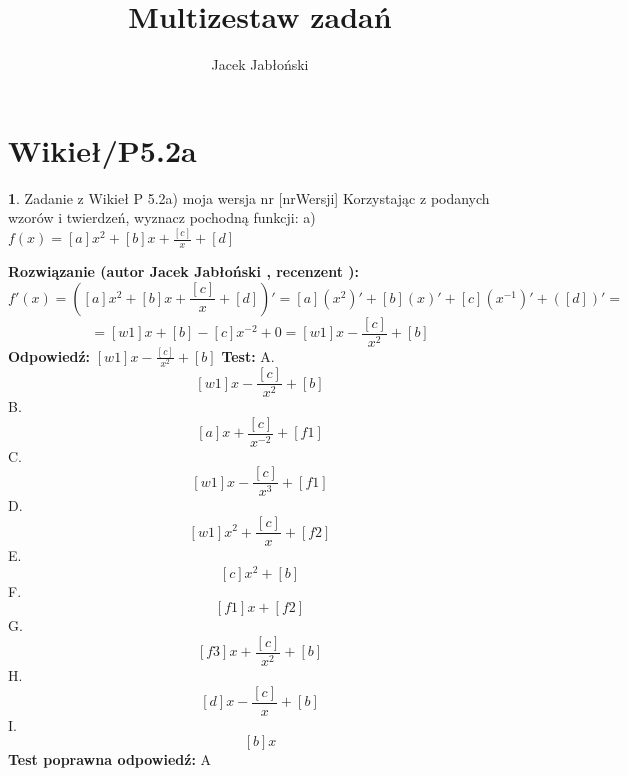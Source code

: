 \documentclass[12pt, a4paper]{article}
\title{Multizestaw zadań}
\author{Jacek Jabłoński}
\date{}
\theoremstyle{definition} %
\newtheorem{zad}{}
\newcommand{\kategoria}[1]{\section{#1}} %
\newcommand{\zadStart}[1]{\begin{zad}#1\newline} %
\newcommand{\zadStop}{\end{zad}}   %
\newcommand{\rozwStart}[2]{\noindent \textbf{Rozwiązanie (autor #1 , recenzent #2): }\newline} %
\newcommand{\rozwStop}{\newline}                                            %
\newcommand{\odpStart}{\noindent \textbf{Odpowiedź:}\newline}    %
\newcommand{\odpStop}{\newline}                                             %
\newcommand{\testStart}{\noindent \textbf{Test:}\newline} %
\newcommand{\testStop}{\newline} %
\newcommand{\kluczStart}{\noindent \textbf{Test poprawna odpowiedź:}\newline} %
\newcommand{\kluczStop}{\newline} %
\begin{document}
\maketitle


\kategoria{Wikieł/P5.2a}
\zadStart{Zadanie z Wikieł P 5.2a) moja wersja nr [nrWersji]}
Korzystając z podanych wzorów i twierdzeń, wyznacz pochodną funkcji:
a) $f(x)=[a]x^2 + [b]x + \frac{[c]}{x} + [d]$
\zadStop
\rozwStart{Jacek Jabłoński}{}
$$f'(x) = ([a]x^2 + [b]x + \frac{[c]}{x} + [d])' = [a](x^2)' + [b](x)' + [c](x^{-1})' + ([d])' = $$
$$= [w1]x + [b] - [c]x^{-2} + 0 = [w1]x - \frac{[c]}{x^2} + [b] $$
\rozwStop
\odpStart
$[w1]x - \frac{[c]}{x^2} + [b]$
\odpStop
\testStart
A. $$[w1]x - \frac{[c]}{x^2} + [b]$$
B. $$[a]x + \frac{[c]}{x^{-2}} + [f1]$$
C. $$[w1]x - \frac{[c]}{x^3} + [f1]$$
D. $$[w1]x^2 + \frac{[c]}{x} + [f2]$$
E. $$[c]{x^2} + [b]$$
F. $$[f1]x + [f2]$$
G. $$[f3]x + \frac{[c]}{x^2} + [b]$$
H. $$[d]x - \frac{[c]}{x} + [b]$$
I. $$ [b]x$$
\testStop
\kluczStart
A
\kluczStop
\end{document}
